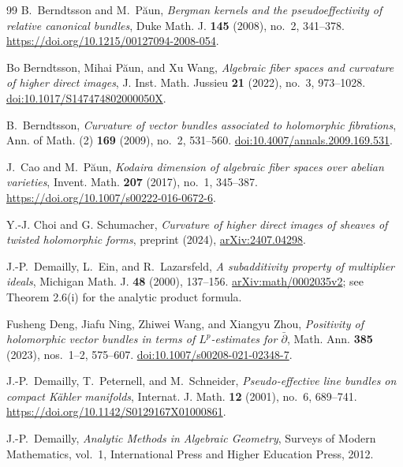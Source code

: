 \documentclass[11pt,reqno]{amsart}
\numberwithin{equation}{section}
\theoremstyle{definition}
\theoremstyle{remark}
\begin{document}
\begin{thebibliography}{99}
B.~Berndtsson and M.~P\u aun,
\emph{Bergman kernels and the pseudoeffectivity of relative canonical bundles},
Duke Math. J. \textbf{145} (2008), no.~2, 341--378.
\url{https://doi.org/10.1215/00127094-2008-054}.

Bo Berndtsson, Mihai P\u{a}un, and Xu Wang, \emph{Algebraic fiber spaces and curvature of higher direct images}, J. Inst. Math. Jussieu \textbf{21} (2022), no.~3, 973--1028. \href{https://doi.org/10.1017/S147474802000050X}{doi:10.1017/S147474802000050X}.

B.~Berndtsson,
\emph{Curvature of vector bundles associated to holomorphic fibrations},
Ann. of Math. (2) \textbf{169} (2009), no.~2, 531--560.
\href{https://doi.org/10.4007/annals.2009.169.531}
{doi:10.4007/annals.2009.169.531}.

J.~Cao and M.~P\u aun,
\emph{Kodaira dimension of algebraic fiber spaces over abelian varieties},
Invent. Math. \textbf{207} (2017), no.~1, 345--387.
\url{https://doi.org/10.1007/s00222-016-0672-6}.

Y.-J. Choi and G. Schumacher, \emph{Curvature of higher direct images of sheaves of twisted holomorphic forms}, preprint (2024), \href{https://arxiv.org/abs/2407.04298}{arXiv:2407.04298}.

J.-P.~Demailly, L.~Ein, and R.~Lazarsfeld,
\emph{A subadditivity property of multiplier ideals},
Michigan Math. J. \textbf{48} (2000), 137--156.
\href{https://arxiv.org/abs/math/0002035}{arXiv:math/0002035v2};
see Theorem 2.6(i) for the analytic product formula.

Fusheng Deng, Jiafu Ning, Zhiwei Wang, and Xiangyu Zhou, \emph{Positivity of holomorphic vector bundles in terms of $L^p$-estimates for $\bar\partial$}, Math. Ann. \textbf{385} (2023), nos.~1--2, 575--607. \href{https://doi.org/10.1007/s00208-021-02348-7}{doi:10.1007/s00208-021-02348-7}.

J.-P.~Demailly, T.~Peternell, and M.~Schneider,
\emph{Pseudo-effective line bundles on compact K\"ahler manifolds},
Internat. J. Math. \textbf{12} (2001), no.~6, 689--741.
\url{https://doi.org/10.1142/S0129167X01000861}.

J.-P.~Demailly,
\emph{Analytic Methods in Algebraic Geometry},
Surveys of Modern Mathematics, vol.~1,
International Press and Higher Education Press, 2012.


\end{thebibliography}
\end{document}
